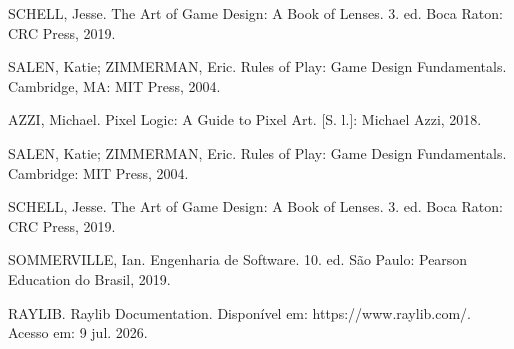 \documentclass[12pt]{article}
\begin{document}
  
  \newpage
  \tableofcontents
  \newpage
  
  \newpage
  

  
  

  SCHELL, Jesse. The Art of Game Design: A Book of Lenses. 3. ed. Boca Raton: CRC Press, 2019.

  SALEN, Katie; ZIMMERMAN, Eric. Rules of Play: Game Design Fundamentals. Cambridge, MA: MIT Press, 2004.

  AZZI, Michael. Pixel Logic: A Guide to Pixel Art. [S. l.]: Michael Azzi, 2018.

  SALEN, Katie; ZIMMERMAN, Eric. Rules of Play: Game Design Fundamentals. Cambridge: MIT Press, 2004.

  SCHELL, Jesse. The Art of Game Design: A Book of Lenses. 3. ed. Boca Raton: CRC Press, 2019.

  SOMMERVILLE, Ian. Engenharia de Software. 10. ed. São Paulo: Pearson Education do Brasil, 2019.

  RAYLIB. Raylib Documentation. Disponível em: https://www.raylib.com/. Acesso em: 9 jul. 2026.
\end{document}
